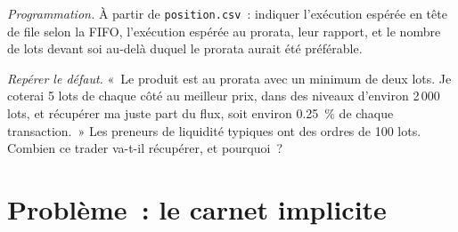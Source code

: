 \begin{exercise}[$\star\star\star$]\label{exo:m1:matching-algorithms-and-implied-spreads:7}
\emph{Programmation.} À partir de \texttt{position.csv}~: indiquer l'exécution espérée en tête
de file selon la FIFO, l'exécution espérée au prorata, leur rapport, et le
nombre de lots devant soi au-delà duquel le prorata aurait été préférable.
\end{exercise}

\begin{exercise}[$\star\star\star$]\label{exo:m1:matching-algorithms-and-implied-spreads:8}
\emph{Repérer le défaut.} «~Le produit est au prorata avec un minimum de deux lots. Je
coterai 5 lots de chaque côté au meilleur prix, dans des niveaux d'environ 2\,000
lots, et récupérer ma juste part du flux, soit environ 0.25~\% de chaque transaction.~»
Les preneurs de liquidité typiques ont des ordres de 100 lots. Combien ce trader va-t-il récupérer, et pourquoi~?
\end{exercise}

\section{Problème~: le carnet implicite}

